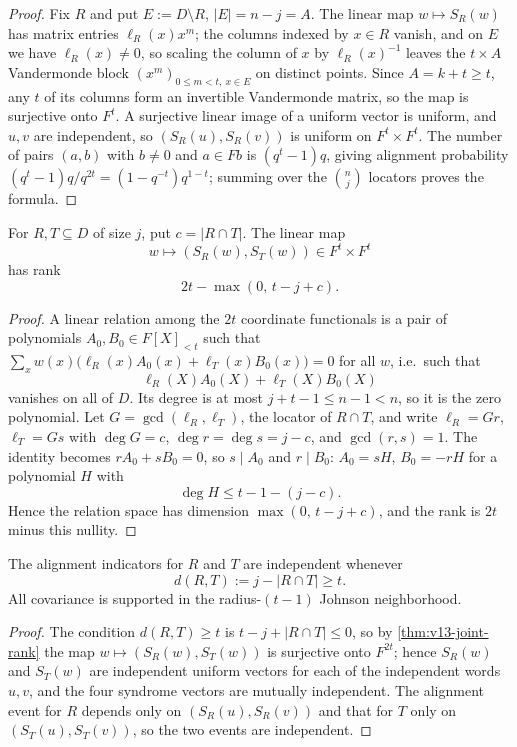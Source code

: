 \begin{proof}
Fix $R$ and put $E:=D\setminus R$, $|E|=n-j=A$.  The linear map $w\mapsto S_R(w)$ has matrix entries $\ell_R(x)x^m$; the columns indexed by $x\in R$ vanish, and on $E$ we have $\ell_R(x)\ne0$, so scaling the column of $x$ by $\ell_R(x)^{-1}$ leaves the $t\times A$ Vandermonde block $(x^m)_{0\le m<t,\ x\in E}$ on distinct points.  Since $A=k+t\ge t$, any $t$ of its columns form an invertible Vandermonde matrix, so the map is surjective onto $F^t$.  A surjective linear image of a uniform vector is uniform, and $u,v$ are independent, so $(S_R(u),S_R(v))$ is uniform on $F^t\times F^t$.  The number of pairs $(a,b)$ with $b\ne0$ and $a\in Fb$ is $(q^t-1)q$, giving alignment probability $(q^t-1)q/q^{2t}=(1-q^{-t})q^{1-t}$; summing over the $\binom nj$ locators proves the formula.
\end{proof}

\begin{theorem}\label{thm:v13-joint-rank}
For $R,T\subseteq D$ of size $j$, put $c=|R\cap T|$.  The linear map
\[
        w\longmapsto (S_R(w),S_T(w))\in F^t\times F^t
\]
has rank
\[
        2t-\max(0,\,t-j+c).
\]
\end{theorem}

\begin{proof}
A linear relation among the $2t$ coordinate functionals is a pair of polynomials $A_0,B_0\in F[X]_{<t}$ such that $\sum_x w(x)\bigl(\ell_R(x)A_0(x)+\ell_T(x)B_0(x)\bigr)=0$ for all $w$, i.e.\ such that
\[
        \ell_R(X)A_0(X)+\ell_T(X)B_0(X)
\]
vanishes on all of $D$.  Its degree is at most $j+t-1\le n-1<n$, so it is the zero polynomial.  Let $G=\gcd(\ell_R,\ell_T)$, the locator of $R\cap T$, and write $\ell_R=Gr$, $\ell_T=Gs$ with $\deg G=c$, $\deg r=\deg s=j-c$, and $\gcd(r,s)=1$.  The identity becomes $rA_0+sB_0=0$, so $s\mid A_0$ and $r\mid B_0$: $A_0=sH$, $B_0=-rH$ for a polynomial $H$ with
\[
        \deg H\le t-1-(j-c).
\]
Hence the relation space has dimension $\max(0,\,t-j+c)$, and the rank is $2t$ minus this nullity.
\end{proof}

\begin{corollary}\label{cor:v13-covariance}
The alignment indicators for $R$ and $T$ are independent whenever
\[
        d(R,T):=j-|R\cap T|\ge t .
\]
All covariance is supported in the radius-$(t-1)$ Johnson neighborhood.
\end{corollary}

\begin{proof}
The condition $d(R,T)\ge t$ is $t-j+|R\cap T|\le0$, so by \cref{thm:v13-joint-rank} the map $w\mapsto(S_R(w),S_T(w))$ is surjective onto $F^{2t}$; hence $S_R(w)$ and $S_T(w)$ are independent uniform vectors for each of the independent words $u,v$, and the four syndrome vectors are mutually independent.  The alignment event for $R$ depends only on $(S_R(u),S_R(v))$ and that for $T$ only on $(S_T(u),S_T(v))$, so the two events are independent.
\end{proof}

